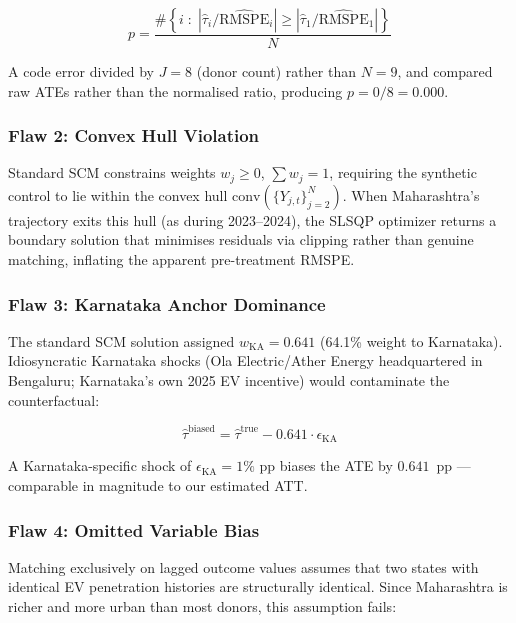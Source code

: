 \documentclass[journal]{IEEEtran}
\begin{document}
\begin{equation}
  p = \frac{\#\!\left\{i \;:\; \left|\hat{\tau}_i / \widehat{\mathrm{RMSPE}}_i
      \right| \geq \left|\hat{\tau}_1 / \widehat{\mathrm{RMSPE}}_1
      \right|\right\}}{N}
  \label{eq:pval}
\end{equation}

A code error divided by $J = 8$ (donor count) rather than $N = 9$,
and compared raw ATEs rather than the normalised ratio, producing
$p = 0/8 = 0.000$.

\subsubsection{Flaw 2: Convex Hull Violation}
Standard SCM constrains weights $w_j \geq 0$, $\sum w_j = 1$, requiring 
the synthetic control to lie within the convex hull 
$\text{conv}(\{Y_{j,t}\}_{j=2}^N)$. When Maharashtra's trajectory exits 
this hull (as during 2023--2024), the SLSQP optimizer returns a 
boundary solution that minimises residuals via clipping rather than 
genuine matching, inflating the apparent pre-treatment RMSPE.

\subsubsection{Flaw 3: Karnataka Anchor Dominance}
The standard SCM solution assigned $w_{\text{KA}} = 0.641$ (64.1\% weight
to Karnataka). Idiosyncratic Karnataka shocks (Ola Electric/Ather Energy
headquartered in Bengaluru; Karnataka's own 2025 EV incentive) would 
contaminate the counterfactual:

\begin{equation}
  \hat{\tau}^{\mathrm{biased}} = \hat{\tau}^{\mathrm{true}} 
  - 0.641 \cdot \epsilon_{\mathrm{KA}}
  \label{eq:bias}
\end{equation}

A Karnataka-specific shock of $\epsilon_{\mathrm{KA}} = 1\%$ pp biases
the ATE by $0.641$~pp — comparable in magnitude to our estimated ATT.

\subsubsection{Flaw 4: Omitted Variable Bias}
Matching exclusively on lagged outcome values assumes that two states 
with identical EV penetration histories are structurally identical. 
Since Maharashtra is richer and more urban than most donors, this 
assumption fails:
\end{document}
